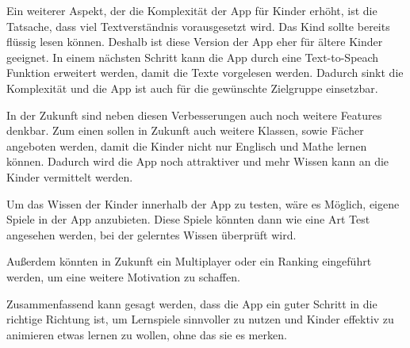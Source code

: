 Ein weiterer Aspekt, der die Komplexität der App für Kinder erhöht, ist die Tatsache, dass viel Textverständnis vorausgesetzt wird. Das Kind sollte bereits flüssig lesen können. Deshalb ist diese Version der App eher für ältere Kinder geeignet. In einem nächsten Schritt kann die App durch eine Text-to-Speach Funktion erweitert werden, damit die Texte vorgelesen werden. Dadurch sinkt die Komplexität und die App ist auch für die gewünschte Zielgruppe einsetzbar.

In der Zukunft sind neben diesen Verbesserungen auch noch weitere Features denkbar. Zum einen sollen in Zukunft auch weitere Klassen, sowie Fächer angeboten werden, damit die Kinder nicht nur Englisch und Mathe lernen können. Dadurch wird die App noch attraktiver und mehr Wissen kann an die Kinder vermittelt werden. 

Um das Wissen der Kinder innerhalb der App zu testen, wäre es Möglich, eigene Spiele in der App anzubieten. Diese Spiele könnten dann wie eine Art Test angesehen werden, bei der gelerntes Wissen überprüft wird. 

Außerdem könnten in Zukunft ein Multiplayer oder ein Ranking eingeführt werden, um eine weitere Motivation zu schaffen.

Zusammenfassend kann gesagt werden, dass die App ein guter Schritt in die richtige Richtung ist, um Lernspiele sinnvoller zu nutzen und Kinder effektiv zu animieren etwas lernen zu wollen, ohne das sie es merken.